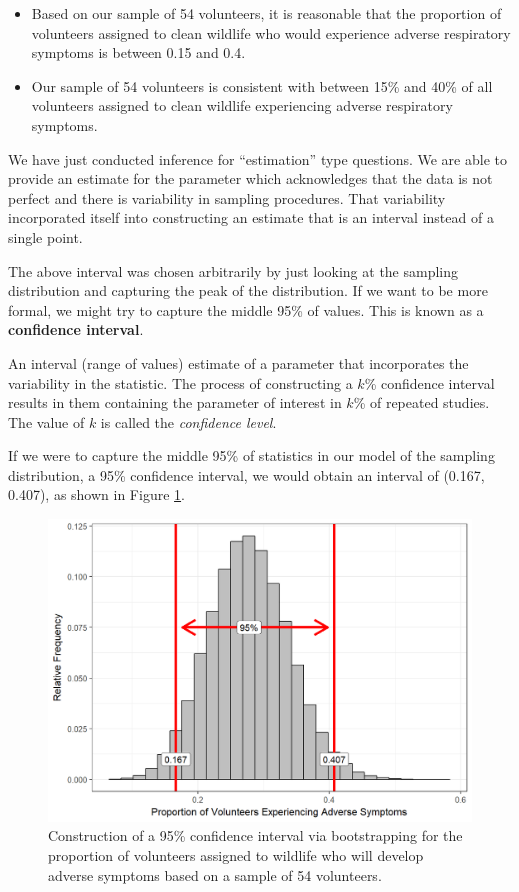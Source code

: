 \documentclass[]{book}
\providecommand{\tightlist}{%
  \setlength{\itemsep}{0pt}\setlength{\parskip}{0pt}}
\theoremstyle{plain}
\theoremstyle{mydefn}
\theoremstyle{myexmpl}
\theoremstyle{remark}
\let\BeginKnitrBlock\begin \let\EndKnitrBlock\end
\let\BeginKnitrBlock\begin \let\EndKnitrBlock\end
\begin{document}
\begin{itemize}
\tightlist
\item
  Based on our sample of 54 volunteers, it is reasonable that the
  proportion of volunteers assigned to clean wildlife who would
  experience adverse respiratory symptoms is between 0.15 and 0.4.
\item
  Our sample of 54 volunteers is consistent with between 15\% and 40\%
  of all volunteers assigned to clean wildlife experiencing adverse
  respiratory symptoms.
\end{itemize}

We have just conducted inference for ``estimation'' type questions. We
are able to provide an estimate for the parameter which acknowledges
that the data is not perfect and there is variability in sampling
procedures. That variability incorporated itself into constructing an
estimate that is an interval instead of a single point.

The above interval was chosen arbitrarily by just looking at the
sampling distribution and capturing the peak of the distribution. If we
want to be more formal, we might try to capture the middle 95\% of
values. This is known as a \textbf{confidence interval}.

\BeginKnitrBlock{definition}[Confidence Interval]
\protect\hypertarget{def:defn-confidence-interval}{}{\label{def:defn-confidence-interval}
{} }An interval (range of values)
estimate of a parameter that incorporates the variability in the
statistic. The process of constructing a \(k\)\% confidence interval
results in them containing the parameter of interest in \(k\)\% of
repeated studies. The value of \(k\) is called the \emph{confidence
level}.
\EndKnitrBlock{definition}

If we were to capture the middle 95\% of statistics in our model of the
sampling distribution, a 95\% confidence interval, we would obtain an
interval of (0.167, 0.407), as shown in Figure
\ref{fig:samplingdistns-deepwater-95ci}.

\begin{figure}

\centering \includegraphics[width=0.8\linewidth]{./Images/samplingdistns-deepwater-95ci-1}


\caption{Construction of a 95\% confidence interval via
bootstrapping for the proportion of volunteers assigned to wildlife who
will develop adverse symptoms based on a sample of 54
volunteers.}\label{fig:samplingdistns-deepwater-95ci}
\end{figure}
\end{document}
